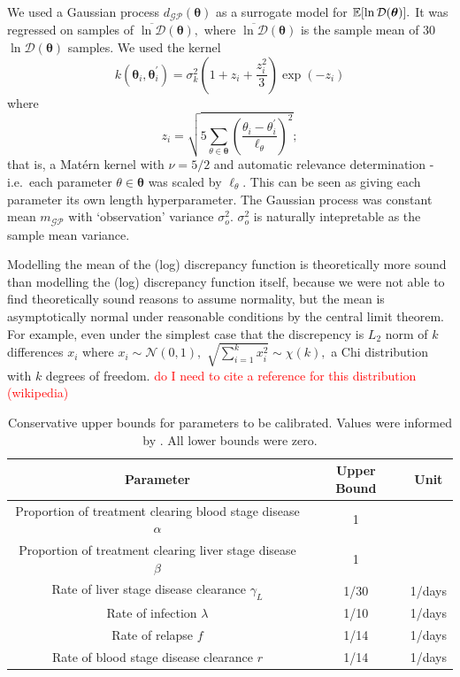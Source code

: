 We used a Gaussian process $d_\mathcal{GP}(\bm{\theta})$ as a surrogate model for
$\operatorname{\mathbb{E}}[\ln\mathcal{D}(\bm{\theta})].$ It was regressed on samples of
$\overline{\ln\mathcal{D}}(\bm{\theta}),$ where
$\overline{\ln\mathcal{D}}(\bm{\theta})$ is the sample mean of 30
$\ln\mathcal{D}(\bm{\theta})$ samples.
We used the kernel
$$
    k(\bm{\theta}_i, \bm{\theta}_i^\prime)
    = \sigma_k^2 (1 + z_i + \frac{z_i^2}{3})\exp(-z_i)
$$
where
$$
    z_i = \sqrt{
        5 \sum_{\theta\in \bm{\theta}}\left(
        \frac{\theta_i - \theta_i^\prime}{\ell_\theta}
        \right)^2
    };
$$ that is, a Mat\'ern kernel with $\nu = 5/2$ and automatic
relevance determination - i.e.\ each parameter $\theta\in\bm{\theta}$ was
scaled by $\ell_\theta.$ This can be seen as giving each parameter its own
length hyperparameter. The Gaussian process was constant mean $m_\mathcal{GP}$
with `observation' variance $\sigma^2_o.$ $\sigma^2_o$ is naturally
intepretable as the sample mean variance.

Modelling the mean of the (log) discrepancy function is theoretically more
sound than modelling the (log) discrepancy function itself, because
we were not able to find theoretically sound reasons to assume normality,
but the mean is asymptotically normal under reasonable conditions by the
central limit theorem. For example, even under the simplest case that the
discrepency is $L_2$ norm of $k$ differences $x_i$ where
$x_i\sim\mathcal{N}(0, 1),$ $\sqrt{\sum_{i=1}^k x_i^2}\sim\chi(k),$ a Chi
distribution with $k$ degrees of freedom.
\textcolor{red}{
    do I need to cite a reference for this distribution (wikipedia)
}

\begin{table}[htbp]
    \centering
    \begin{tabular}{c |c |c}
        Parameter                                                     & Upper Bound & Unit   \\
        \hline
        Proportion of treatment clearing blood stage disease $\alpha$ & 1           &        \\
        Proportion of treatment clearing liver stage disease $\beta$  & 1           &        \\
        Rate of liver stage disease clearance $\gamma_L$              & 1/30        & 1/days \\
        Rate of infection $\lambda$                                   & 1/10        & 1/days \\
        Rate of relapse $f$                                           & 1/14        & 1/days \\
        Rate of blood stage disease clearance $r$                     & 1/14        & 1/days
    \end{tabular}
    \caption{
        Conservative upper bounds for parameters to be calibrated.
        Values were informed by
        \cite{champagne_using_2022, white_variation_2016}. All lower bounds
        were zero.
    }
    \label{table:param_bounds}
\end{table}

